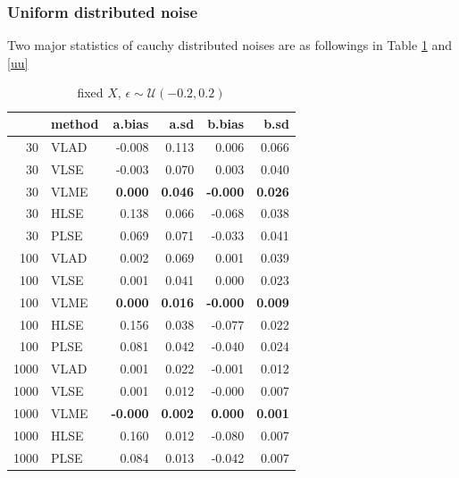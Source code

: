 \documentclass[twoside]{article}
\begin{document}
\subsubsection*{Uniform distributed noise}

Two major statistics of cauchy distributed noises are as followings in Table \ref{uf} and \ref{uu}

\begin{table}[ht]
\centering
\caption{fixed $X$, $\epsilon \sim \mathcal{U}(-0.2,0.2)$}
\begin{tabular}{rlrrrr}
  \hline
 & method & a.bias & a.sd & b.bias & b.sd \\ 
  \hline
  30 & VLAD & -0.008 & 0.113 & 0.006 & 0.066 \\ 
  30 & VLSE & -0.003 & 0.070 & 0.003 & 0.040 \\ 
  30 & VLME & \textbf{0.000} & \textbf{0.046} & \textbf{-0.000} & \textbf{0.026} \\ 
  30 & HLSE & 0.138 & 0.066 & -0.068 & 0.038 \\ 
  30 & PLSE & 0.069 & 0.071 & -0.033 & 0.041 \\ 
  \hline
  100 & VLAD & 0.002 & 0.069 & 0.001 & 0.039 \\ 
  100 & VLSE & 0.001 & 0.041 & 0.000 & 0.023 \\ 
  100 & VLME & \textbf{0.000} & \textbf{0.016} & \textbf{-0.000} & \textbf{0.009} \\ 
  100 & HLSE & 0.156 & 0.038 & -0.077 & 0.022 \\ 
  100 & PLSE & 0.081 & 0.042 & -0.040 & 0.024 \\ 
  \hline
  1000 & VLAD & 0.001 & 0.022 & -0.001 & 0.012 \\ 
  1000 & VLSE & 0.001 & 0.012 & -0.000 & 0.007 \\ 
  1000 & VLME & \textbf{-0.000} & \textbf{0.002} & \textbf{0.000} & \textbf{0.001} \\ 
  1000 & HLSE & 0.160 & 0.012 & -0.080 & 0.007 \\ 
  1000 & PLSE & 0.084 & 0.013 & -0.042 & 0.007 \\ 
   \hline
\end{tabular}
\label{uf}
\end{table}
\end{document}
